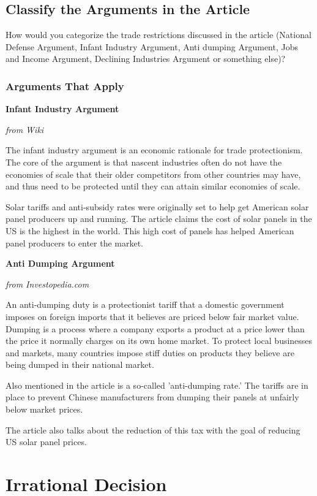 \documentclass[a4paper]{article}
\begin{document}
\subsection{Classify the Arguments in the Article}


How would you categorize the trade restrictions discussed in the article (National Defense Argument, Infant Industry Argument, Anti dumping Argument, 
Jobs and Income Argument, Declining Industries Argument or something else)? 

\subsubsection{Arguments That Apply}

\textbf{Infant Industry Argument}

\textit{from Wiki}

The infant industry argument is an economic rationale for trade protectionism. The core of the argument is that nascent industries often do 
not have the economies of scale that their older competitors from other countries may have, and thus need to be protected until they can attain similar economies of scale. 

Solar tariffs and anti-subsidy rates were originally set to help get American solar panel producers up and running. The article claims the cost of solar panels in the US is the highest in the world.
This high cost of panels has helped American panel producers to enter the market.

\textbf{Anti Dumping Argument}

\textit{from Investopedia.com}

An anti-dumping duty is a protectionist tariff that a domestic government imposes on foreign imports that it believes are priced below fair market value. 
Dumping is a process where a company exports a product at a price lower than the price it normally charges on its own home market. 
To protect local businesses and markets, many countries impose stiff duties on products they believe are being dumped in their national market. 

Also mentioned in the article is a so-called 'anti-dumping rate.' The tariffs are in place to prevent Chinese manufacturers from dumping their panels at unfairly below market prices.

The article also talks about the reduction of this tax with the goal of reducing US solar panel prices.


\section{Irrational Decision}
\end{document}
